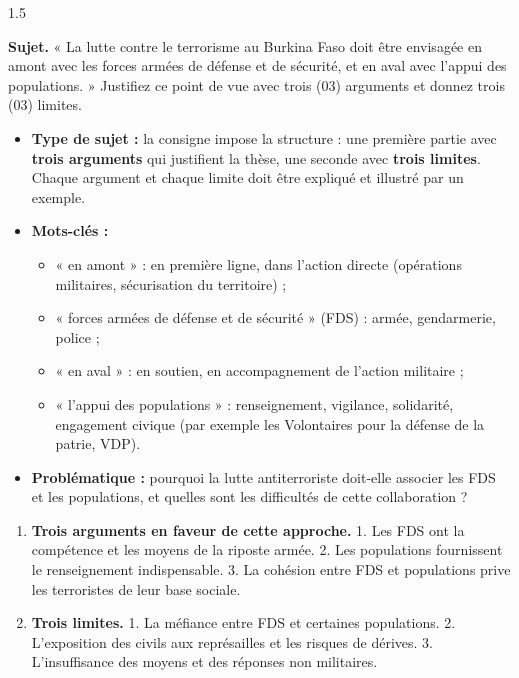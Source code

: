\documentclass[12pt]{article}
\begin{document}
\begin{spacing}{1.5}

\noindent\textbf{Sujet.} « La lutte contre le terrorisme au Burkina Faso doit être envisagée en amont avec les forces armées de défense et de sécurité, et en aval avec l'appui des populations. » Justifiez ce point de vue avec trois (03) arguments et donnez trois (03) limites.


\begin{itemize}
\item \textbf{Type de sujet :} la consigne impose la structure : une première partie avec \textbf{trois arguments} qui justifient la thèse, une seconde avec \textbf{trois limites}. Chaque argument et chaque limite doit être expliqué et illustré par un exemple.
\item \textbf{Mots-clés :}
  \begin{itemize}
  \item « en amont » : en première ligne, dans l'action directe (opérations militaires, sécurisation du territoire) ;
  \item « forces armées de défense et de sécurité » (FDS) : armée, gendarmerie, police ;
  \item « en aval » : en soutien, en accompagnement de l'action militaire ;
  \item « l'appui des populations » : renseignement, vigilance, solidarité, engagement civique (par exemple les Volontaires pour la défense de la patrie, VDP).
  \end{itemize}
\item \textbf{Problématique :} pourquoi la lutte antiterroriste doit-elle associer les FDS et les populations, et quelles sont les difficultés de cette collaboration ?
\end{itemize}


\begin{enumerate}
\item[I.] \textbf{Trois arguments en faveur de cette approche.} 1. Les FDS ont la compétence et les moyens de la riposte armée. 2. Les populations fournissent le renseignement indispensable. 3. La cohésion entre FDS et populations prive les terroristes de leur base sociale.
\item[II.] \textbf{Trois limites.} 1. La méfiance entre FDS et certaines populations. 2. L'exposition des civils aux représailles et les risques de dérives. 3. L'insuffisance des moyens et des réponses non militaires.
\end{enumerate}


\end{spacing}
\end{document}
